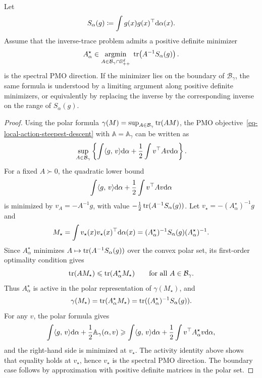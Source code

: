 \begin{prop}\label{prop-normalized-spectral-polar}
	Let
	\[
		S_\alpha(g)\coloneqq\int g(x)g(x)^\top\mathrm{d}\alpha(x).
	\]
	Assume that the inverse-trace problem admits a positive definite minimizer
	\[
		A_\alpha^\star
		\in
		\underset{A\in\mathcal B_\gamma\cap\mathbb S_{++}^d}{\operatorname{argmin}}\;
		\operatorname{tr}\!\left(A^{-1}S_\alpha(g)\right).
	\]
	is the spectral PMO direction. If the minimizer lies on the boundary of $\mathcal B_\gamma$, the same formula is understood by a limiting argument along positive definite minimizers, or equivalently by replacing the inverse by the corresponding inverse on the range of $S_\alpha(g)$.
\end{prop}
\begin{proof}
	Using the polar formula $\gamma(M)=\sup_{A\in\mathcal B_\gamma}\operatorname{tr}(AM)$, the PMO objective~\eqref{eq-local-action-steepest-descent} with \(\mathbb A=\mathbb A_\gamma\) can be written as
	\[
		\sup_{A\in\mathcal B_\gamma}
		\left\{
		\int \langle g,\,v\rangle\mathrm{d}\alpha
		+
		\frac12\int v^\top A v\mathrm{d}\alpha
		\right\}.
	\]
	For a fixed $A\succ0$, the quadratic lower bound
	\[
		\int \langle g,\,v\rangle\mathrm{d}\alpha+\frac12\int v^\top A v\mathrm{d}\alpha
	\]
	is minimized by $v_A=-A^{-1}g$, with value $-\frac12\operatorname{tr}(A^{-1}S_\alpha(g))$. Let $v_\star=-(A_\alpha^\star)^{-1}g$ and
	\[
		M_\star=\int v_\star(x)v_\star(x)^\top\mathrm{d}\alpha(x)
		=
		(A_\alpha^\star)^{-1}S_\alpha(g)(A_\alpha^\star)^{-1}.
	\]
	Since $A_\alpha^\star$ minimizes $A\mapsto\operatorname{tr}(A^{-1}S_\alpha(g))$ over the convex polar set, its first-order optimality condition gives
	\[
		\operatorname{tr}(AM_\star)\leqslant \operatorname{tr}(A_\alpha^\star M_\star)
		\qquad
		\text{for all } A\in\mathcal B_\gamma.
	\]
	Thus $A_\alpha^\star$ is active in the polar representation of $\gamma(M_\star)$, and
	\[
		\gamma(M_\star)=\operatorname{tr}(A_\alpha^\star M_\star)
		=
		\operatorname{tr}((A_\alpha^\star)^{-1}S_\alpha(g)).
	\]
	For any $v$, the polar formula gives
	\[
		\int \langle g,\,v\rangle\mathrm{d}\alpha+\frac12\mathbb A_\gamma(\alpha,v)
		\geqslant
		\int \langle g,\,v\rangle\mathrm{d}\alpha+\frac12\int v^\top A_\alpha^\star v\mathrm{d}\alpha,
	\]
	and the right-hand side is minimized at $v_\star$. The activity identity above shows that equality holds at $v_\star$, hence $v_\star$ is the spectral PMO direction. The boundary case follows by approximation with positive definite matrices in the polar set.
\end{proof}

